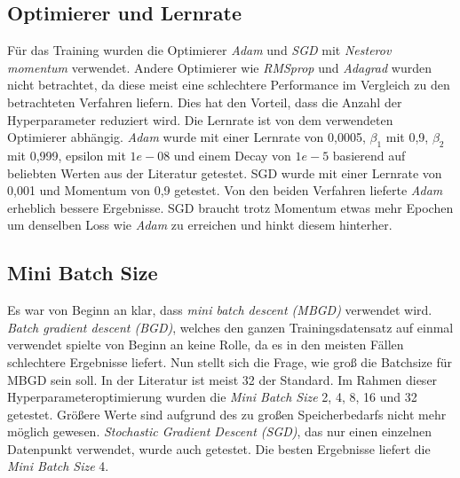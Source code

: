 \documentclass[conference]{IEEEtran}
\begin{document}
\subsection{Optimierer und Lernrate}
Für das Training wurden die Optimierer \textit{Adam} und \textit{SGD} mit \textit{Nesterov momentum} verwendet. Andere Optimierer wie \textit{RMSprop} und \textit{Adagrad} wurden nicht betrachtet, da diese meist eine schlechtere Performance im Vergleich zu den betrachteten Verfahren liefern. Dies hat den Vorteil, dass die Anzahl der Hyperparameter reduziert wird. Die Lernrate ist von dem verwendeten Optimierer abhängig. \textit{Adam} wurde mit einer Lernrate von 0,0005, $\beta_1$ mit 0,9, $\beta_2$ mit 0,999, epsilon mit $1e-08$ und einem Decay von $1e-5$ basierend auf beliebten Werten aus der Literatur getestet\cite{Adam}. SGD wurde mit einer Lernrate von 0,001 und Momentum von 0,9 getestet. Von den beiden Verfahren lieferte \textit{Adam} erheblich bessere Ergebnisse. SGD braucht trotz Momentum etwas mehr Epochen um denselben Loss wie \textit{Adam} zu erreichen und hinkt diesem hinterher.

\subsection{Mini Batch Size}
Es war von Beginn an klar, dass \textit{mini batch descent (MBGD)} verwendet wird. \textit{Batch gradient descent (BGD)}, welches den ganzen Trainingsdatensatz auf einmal verwendet spielte von Beginn an keine Rolle, da es in den meisten Fällen schlechtere Ergebnisse liefert. Nun stellt sich die Frage, wie groß die Batchsize für MBGD sein soll. In der Literatur ist meist 32 der Standard. Im Rahmen dieser Hyperparameteroptimierung wurden die \textit{Mini Batch Size} 2, 4, 8, 16 und 32 getestet. Größere Werte sind aufgrund des zu großen Speicherbedarfs nicht mehr möglich gewesen. \textit{Stochastic Gradient Descent (SGD)}, das nur einen einzelnen Datenpunkt verwendet, wurde auch getestet. Die besten Ergebnisse liefert die \textit{Mini Batch Size} 4.
\end{document}
